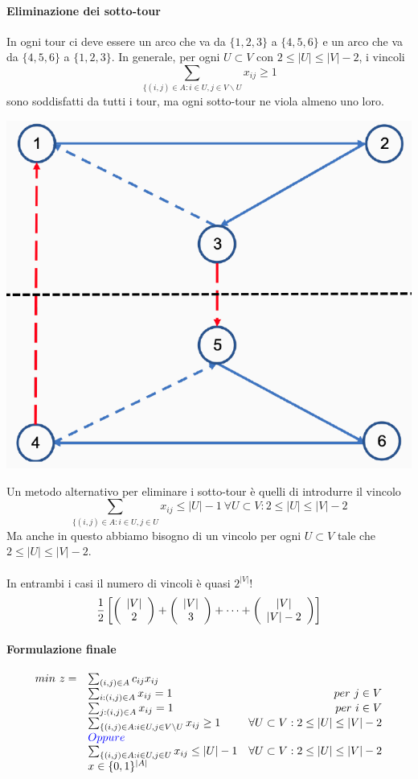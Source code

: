 \documentclass[12pt,a4paper]{article}
\begin{document}
\paragraph{Eliminazione dei sotto-tour}
In ogni tour ci deve essere un arco che va da $\{1,2,3\}$ a $\{4,5,6\}$ e un arco che va da $\{4,5,6\}$ a $\{1,2,3\}$. In generale, per ogni $U \subset V$ con $2 \leq |U| \leq |V|-2$, i vincoli 
$$\sum_{\{(i,j)\in A: i \in U, j \in V\backslash U}x_{ij} \geq 1$$
sono soddisfatti da tutti i tour, ma ogni sotto-tour ne viola almeno uno loro.
\begin{center}
\includegraphics[width=0.4\columnwidth]{img/subtour2.png}
\end{center}
Un metodo alternativo per eliminare i sotto-tour è quelli di introdurre il vincolo
$$\sum_{\{(i,j)\in A: i \in U, j \in U}x_{ij} \leq |U|-1\ \forall U\subset V:2 \leq |U| \leq |V|-2$$
Ma anche in questo abbiamo bisogno di un vincolo per ogni $U\subset V$ tale che $2 \leq |U| \leq |V|-2$.\\
\\
In entrambi i casi il numero di vincoli è quasi $2^{|V|}$!
$${1\over 2}\left[\left(\begin{array}{c}|V| \\ 2\end{array}\right)+\left(\begin{array}{c}|V| \\ 3\end{array}\right) + \dots + \left(\begin{array}{c}|V| \\ |V|-2\end{array}\right)\right]$$

\Sep \Sep \noindent
\paragraph{Formulazione finale}
$$\begin{array}{rlr}
min\ z = & \sum_{(i,j) \in A}c_{ij}x_{ij} & \\
& \sum_{i:(i,j)\in A}x_{ij} = 1 & per \ j \in V\\
& \sum_{j:(i,j)\in A}x_{ij} = 1 & per \ i \in V\\
& \sum_{\{(i,j)\in A: i \in U, j \in V\backslash U}x_{ij} \geq 1 & \forall U\subset V:2 \leq |U| \leq |V|-2\\
& \textcolor{blue}{Oppure} & \\
& \sum_{\{(i,j)\in A: i \in U, j \in U}x_{ij} \leq |U|-1 & \forall U\subset V:2 \leq |U| \leq |V|-2\\
& x \in \{0,1\}^{|A|} &
\end{array}$$
\end{document}
